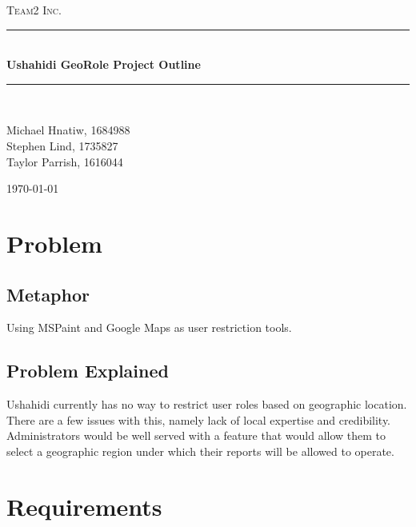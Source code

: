 \documentclass{article}
\newcommand{\HRule}{\rule{\linewidth}{0.5mm}}
\begin{document}
\begin{titlepage}
\begin{center}
\textsc{\LARGE Team2 Inc.}\\[1.5cm]

\HRule \\[1.4cm]
{ \huge \bfseries Ushahidi GeoRole Project Outline}\\[0.4cm]

\HRule \\[1.5cm]

\begin{minipage}{0.4\textwidth}
\begin{center}
\large Michael Hnatiw, 1684988\\
\large Stephen Lind, 1735827\\
\large Taylor Parrish, 1616044\\
\end{center}
\end{minipage}

\vfill
{\large \today}
\end{center}
\end{titlepage}

\section{Problem}
\subsection{Metaphor}
Using MSPaint and Google Maps as user restriction tools.
\subsection{Problem Explained}
Ushahidi currently has no way to restrict user roles based on geographic location. There are a few issues with this, namely lack of local expertise and credibility. Administrators would be well served with a feature that would allow them to select a geographic region under which their reports will be allowed to operate.

\section{Requirements}
\end{document}

